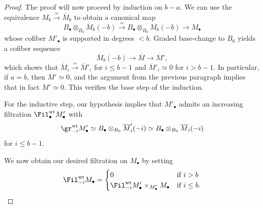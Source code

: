 \documentclass[10pt]{amsart}
\begin{document}
\begin{proof}
The proof will now proceed by induction on $b-a$. We can use the equivalence $M_b\xrightarrow{\simeq}\overline{M}_b$ to obtain a canonical map
\[
B_\bullet\otimes_{B_0}\overline{M}_b(-b)\xrightarrow{\simeq}B_\bullet\otimes_{B_0}M_b(-b)\to M_\bullet 
\]
whose cofiber $M'_\bullet$ is supported in degrees $< b$. Graded base-change to $B_0$ yields a cofiber sequence
\[
\overline{M}_b(-b)\to \overline{M}\to \overline{M}',
\]
which shows that $\overline{M}_i\xrightarrow{\simeq}\overline{M}'_i$ for $i\leq b-1$ and $\overline{M}'_i\simeq 0$ for $i>b-1$. In particular, if $a=b$, then $\overline{M}'\simeq 0$, and the argument from the previous paragraph implies that in fact $M'\simeq 0$. This verifies the base step of the induction.


For the inductive step, our hypothesis implies that $M'_\bullet$ admits an increasing filtration $\Fil_\bullet^{\mathrm{wt}}M'_\bullet$ with 
\[
\gr_{-i}^{\mathrm{wt}}M'_\bullet \simeq B_\bullet\otimes_{B_0}\overline{M}'_{i}(-i) \simeq B_\bullet\otimes_{B_0}\overline{M}_{i}(-i)
\]
for $i\le b-1$.

We now obtain our desired filtration on $M_\bullet$ by setting
\[
\Fil_{-i}^{\mathrm{wt}}M_\bullet = \begin{cases}
0&\text{if $i> b$}\\
\Fil_{-i}^{\mathrm{wt}}M'_\bullet\times_{M'_\bullet}M_\bullet&\text{if $i\le b$}.
\end{cases} 
\]
\end{proof}
\end{document}
